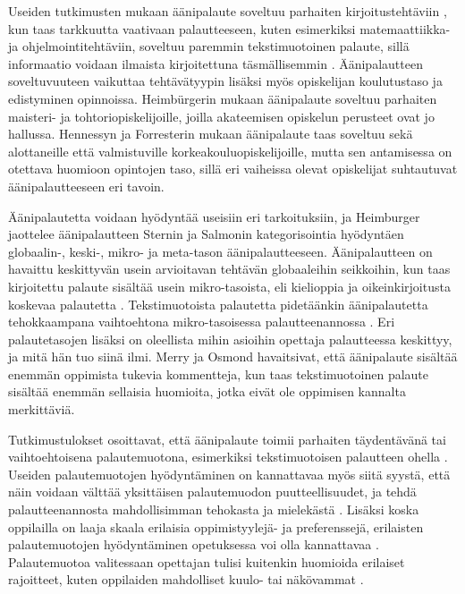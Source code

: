 \documentclass[utf8]{gradu3}
\begin{document}
Useiden tutkimusten mukaan äänipalaute soveltuu parhaiten kirjoitustehtäviin \parencite[][]{academics, engaging, using}, kun taas tarkkuutta vaativaan palautteeseen, kuten esimerkiksi matemaattiikka- ja ohjelmointitehtäviin, soveltuu paremmin tekstimuotoinen palaute, sillä informaatio voidaan ilmaista kirjoitettuna täsmällisemmin \parencite[][]{academics}. Äänipalautteen soveltuvuuteen vaikuttaa tehtävätyypin lisäksi myös opiskelijan koulutustaso ja edistyminen opinnoissa. Heimbürgerin \parencite*[][]{using} mukaan äänipalaute soveltuu parhaiten maisteri- ja tohtoriopiskelijoille, joilla akateemisen opiskelun perusteet ovat jo hallussa. Hennessyn ja Forresterin \parencite*[][]{developing} mukaan äänipalaute taas soveltuu sekä alottaneille että valmistuville korkeakouluopiskelijoille, mutta sen antamisessa on otettava huomioon opintojen taso, sillä eri vaiheissa olevat opiskelijat suhtautuvat äänipalautteeseen eri tavoin.

Äänipalautetta voidaan hyödyntää useisiin eri tarkoituksiin, ja Heimburger \parencite[][]{using} jaottelee äänipalautteen Sternin ja Salmonin \parencite[][]{stern} kategorisointia hyödyntäen globaalin-, keski-, mikro- ja meta-tason äänipalautteeseen. Äänipalautteen on havaittu keskittyvän usein arvioitavan tehtävän globaaleihin seikkoihin, kun taas kirjoitettu palaute sisältää usein mikro-tasoista, eli kielioppia ja oikeinkirjoitusta koskevaa palautetta \parencite[][]{versus}. Tekstimuotoista palautetta pidetäänkin äänipalautetta tehokkaampana vaihtoehtona mikro-tasoisessa palautteenannossa \parencite[][]{ice}. Eri palautetasojen lisäksi on oleellista mihin asioihin opettaja palautteessa keskittyy, ja mitä hän tuo siinä ilmi. Merry ja Osmond \parencite*[][]{attitudes} havaitsivat, että äänipalaute sisältää enemmän oppimista tukevia kommentteja, kun taas tekstimuotoinen palaute sisältää enemmän sellaisia huomioita, jotka eivät ole oppimisen kannalta merkittäviä.

Tutkimustulokset osoittavat, että äänipalaute toimii parhaiten täydentävänä tai vaihtoehtoisena palautemuotona, esimerkiksi tekstimuotoisen palautteen ohella \parencite[][]{academics, modes, ice}. Useiden palautemuotojen hyödyntäminen on kannattavaa myös siitä syystä, että näin voidaan välttää yksittäisen palautemuodon puutteellisuudet, ja tehdä palautteenannosta mahdollisimman tehokasta ja mielekästä \parencite[][]{modes}. Lisäksi koska oppilailla on laaja skaala erilaisia oppimistyylejä- ja preferenssejä, erilaisten palautemuotojen hyödyntäminen opetuksessa voi olla kannattavaa \parencite[][]{style}. Palautemuotoa valitessaan opettajan tulisi kuitenkin huomioida erilaiset rajoitteet, kuten oppilaiden mahdolliset kuulo- tai näkövammat \parencite[][]{evaluating}.
\end{document}
